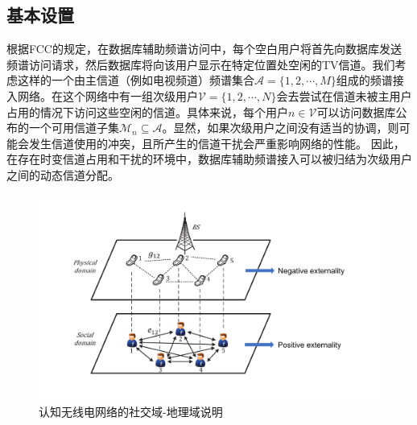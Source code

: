 \subsection{基本设置}\label{sec:system-model}
根据FCC\cite{FCCApril52012}的规定，在数据库辅助频谱访问中，每个空白用户将首先向数据库发送频谱访问请求，然后数据库将向该用户显示在特定位置处空闲的TV信道。我们考虑这样的一个由主信道（例如电视频道）频谱集合$\mathcal{A}=\{1,2,\cdots,M\}$组成的频谱接入网络。在这个网络中有一组次级用户$\mathcal{V}=\{1,2,\cdots,N\}$会去尝试在信道未被主用户占用的情况下访问这些空闲的信道。具体来说，每个用户$n\in\mathcal{V}$可以访问数据库公布的一个可用信道子集$\mathcal{M}_n\subseteq\mathcal{A}$。显然，如果次级用户之间没有适当的协调，则可能会发生信道使用的冲突，且所产生的信道干扰会严重影响网络的性能。 {\kaishu 因此，在存在时变信道占用和干扰的环境中，数据库辅助频谱接入可以被归结为次级用户之间的动态信道分配。}
\begin{figure}[!t]
\centering
\includegraphics[scale=0.64]{./pic/sysfig11.pdf}
\caption{认知无线电网络的社交域-地理域说明}\label{fg:domain}
\end{figure}

